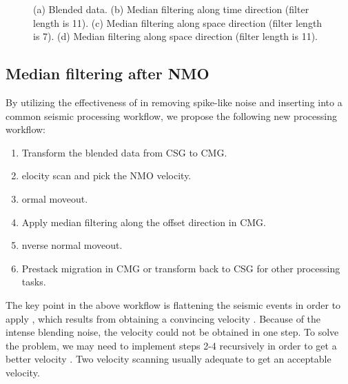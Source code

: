 \begin{figure}[htb!]
  \centering
   \caption{(a) Blended data. (b) Median filtering along  time direction (filter length is 11). (c) Median filtering along space direction (filter length is 7). (d) Median filtering along space direction (filter length is 11). } 
   \label{fig:huos,huos-tmf,huos-xmf7,huos-xmf11}%
\end{figure}

\subsection{Median filtering after NMO}
By utilizing the effectiveness of  in removing spike-like noise and inserting  into a common seismic processing workflow, we propose the following new processing workflow:
\begin{enumerate}
\item Transform the blended data from CSG to CMG.
\item {} elocity scan and pick the NMO velocity.
\item {} ormal moveout.
\item Apply median filtering along the offset direction in CMG.
\item {} nverse normal moveout.
\item Prestack migration in CMG or transform back to CSG for other processing tasks. 
\end{enumerate}

The key point in the above workflow is flattening the seismic events in order to apply  , which results from obtaining a convincing velocity . Because of the intense blending noise, the velocity  could not be obtained in one step. To solve the problem, we may need to implement steps 2-4 recursively\old{,} in order to get a better velocity . Two velocity scanning  usually adequate to get an acceptable velocity. 


